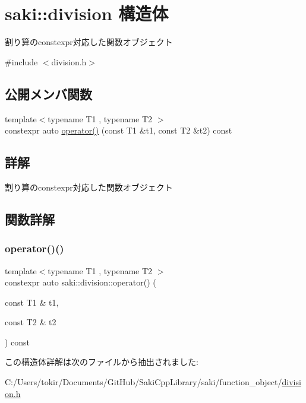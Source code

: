 \hypertarget{structsaki_1_1division}{}\section{saki\+:\+:division 構造体}
\label{structsaki_1_1division}


割り算のconstexpr対応した関数オブジェクト  




{\ttfamily \#include $<$division.\+h$>$}

\subsection*{公開メンバ関数}
\begin{DoxyCompactItemize}
\item 
{\footnotesize template$<$typename T1 , typename T2 $>$ }\\constexpr auto \mbox{\hyperlink{structsaki_1_1division_a4ded7d15a028cf98a5c5f72cf33ddba0}{operator()}} (const T1 \&t1, const T2 \&t2) const
\end{DoxyCompactItemize}


\subsection{詳解}
割り算のconstexpr対応した関数オブジェクト 

\subsection{関数詳解}
\mbox{\label{structsaki_1_1division_a4ded7d15a028cf98a5c5f72cf33ddba0}} 
\subsubsection{\texorpdfstring{operator()()}{operator()()}}
{\footnotesize\ttfamily template$<$typename T1 , typename T2 $>$ \\
constexpr auto saki\+::division\+::operator() (\begin{DoxyParamCaption}\item[{const T1 \&}]{t1,  }\item[{const T2 \&}]{t2 }\end{DoxyParamCaption}) const\hspace{0.3cm}{\ttfamily [inline]}}



この構造体詳解は次のファイルから抽出されました\+:\begin{DoxyCompactItemize}
\item 
C\+:/\+Users/tokir/\+Documents/\+Git\+Hub/\+Saki\+Cpp\+Library/saki/function\+\_\+object/\mbox{\hyperlink{division_8h}{division.\+h}}\end{DoxyCompactItemize}
